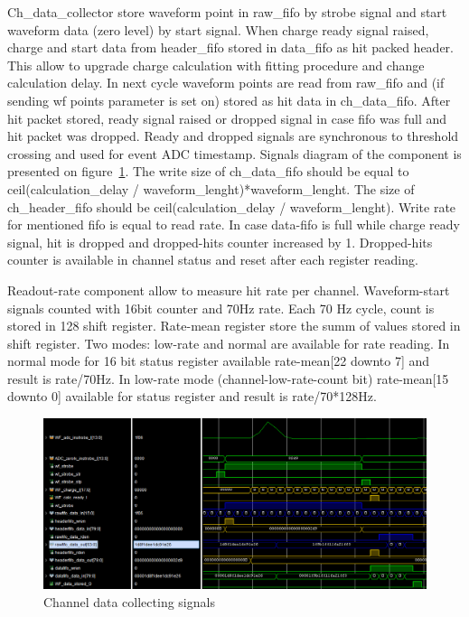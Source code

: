 \documentclass{article}
\begin{document}
Ch\_data\_collector store waveform point in raw\_fifo by strobe signal and start waveform data (zero level) by start signal. When charge ready signal raised, charge and start data from header\_fifo stored in data\_fifo as hit packed header. This allow to upgrade charge calculation with fitting procedure and change calculation delay. In next cycle waveform points are read from raw\_fifo and (if sending wf points parameter is set on) stored as hit data in ch\_data\_fifo. After hit packet stored, ready signal raised or dropped signal in case fifo was full and hit packet was dropped. Ready and dropped signals are synchronous to threshold crossing and used for event ADC timestamp.  Signals diagram of the component is presented on figure~\ref{fig:4}. The write size of ch\_data\_fifo should be equal to ceil(calculation\_delay / waveform\_lenght)*waveform\_lenght. The size of ch\_header\_fifo should be ceil(calculation\_delay / waveform\_lenght). Write rate for mentioned fifo is equal to read rate.
In case data-fifo is full while charge ready signal, hit is dropped and dropped-hits counter increased by 1. Dropped-hits counter is available in channel status and reset after each register reading.

Readout-rate component allow to measure hit rate per channel. Waveform-start signals counted with 16bit counter and 70Hz rate. Each 70 Hz cycle, count is stored in 128 shift register. Rate-mean register store the summ of values stored in shift register. Two modes: low-rate and normal are available for rate reading. In normal mode for 16 bit status register available rate-mean[22 downto 7] and result is rate/70Hz. In low-rate mode (channel-low-rate-count bit) rate-mean[15 downto 0] available for status register and result is rate/70*128Hz.

\begin{figure}[H]
	\centering 
	\includegraphics[width=1.0\textwidth]{ADC_ch_data_collector_wave.png}
	\caption{\label{fig:4} Channel data collecting signals}
\end{figure}
\end{document}
